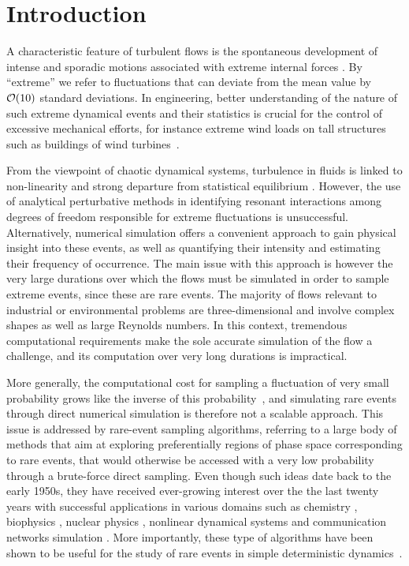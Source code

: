 \section{Introduction}

%
A characteristic feature of turbulent flows is the spontaneous development of intense and sporadic motions associated with extreme internal forces \citep{lesieur_book,donzis_sreenivasan_2010,Yeung}.
By ``extreme'' we refer to fluctuations that can deviate from the mean value by ${\cal{O}}(10)$ standard deviations.
In engineering, better understanding of the nature of such extreme dynamical events and their statistics is crucial for the control of excessive mechanical efforts, for instance extreme wind loads on tall structures such as buildings of wind turbines~\cite{kanev2010}.
%

From the viewpoint of chaotic dynamical systems, turbulence in fluids is linked to non-linearity and strong departure from statistical equilibrium \citep{KRAICHNAN}.
However, the use of analytical perturbative methods in identifying resonant interactions among degrees of freedom responsible for extreme fluctuations is unsuccessful.
Alternatively, numerical simulation offers a convenient approach to gain physical insight into these events, as well as quantifying their intensity and estimating their frequency of occurrence.
The main issue with this approach is however the very large durations over which the flows must be simulated in order to sample extreme events, since these are rare events.
The majority of flows relevant to industrial or environmental problems are three-dimensional and involve complex shapes as well as large Reynolds numbers.
In this context, tremendous computational requirements make the sole accurate simulation of the flow a challenge, and its computation over very long durations is impractical.

%
More generally, the computational cost for sampling a fluctuation of very small probability grows like the inverse of this probability~\cite{wouters2016rare}, and simulating rare events through direct numerical simulation is therefore not a scalable approach.
This issue is addressed by rare-event sampling algorithms, referring to a large body of methods that aim at exploring preferentially regions of phase space corresponding to rare events, that would otherwise be accessed with a very low probability through a brute-force direct sampling.
%
Even though such ideas date back to the early 1950s, they have received ever-growing interest over the the last twenty years with successful applications in various domains such as chemistry \citep{van_erp_elaborating_2005,escobedo_transition_2009,teo_adaptive_2016}, biophysics \citep{huber_weighted-ensemble_1996,zuckerman2017weighted,bolhuis2005kinetic}, nuclear physics \citep{louvin2017}, nonlinear dynamical systems \citep{tailleur_probing_2007} and communication networks simulation \citep{villen-altamirano_restart:_1994}.
More importantly, these type of algorithms have been shown to be useful for the study of rare events in simple deterministic dynamics~\citep{wouters2016rare}.

